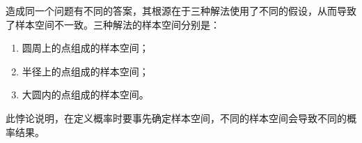 造成同一个问题有不同的答案，其根源在于三种解法使用了不同的假设，从而导致了样本空间不一致。三种解法的样本空间分别是：
\begin{enumerate}
\item 圆周上的点组成的样本空间；
\item 半径上的点组成的样本空间；
\item 大圆内的点组成的样本空间。
\end{enumerate}

此悖论说明，在定义概率时要事先确定样本空间，不同的样本空间会导致不同的概率结果。